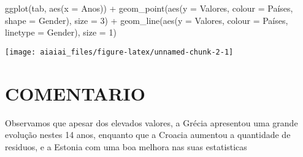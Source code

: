 \documentclass[
]{article}
\newenvironment{Shaded}{\begin{snugshade}}{\end{snugshade}}
\newcommand{\AttributeTok}[1]{\textcolor[rgb]{0.77,0.63,0.00}{#1}}
\newcommand{\DecValTok}[1]{\textcolor[rgb]{0.00,0.00,0.81}{#1}}
\newcommand{\FunctionTok}[1]{\textcolor[rgb]{0.00,0.00,0.00}{#1}}
\newcommand{\NormalTok}[1]{#1}
\newcommand{\SpecialCharTok}[1]{\textcolor[rgb]{0.00,0.00,0.00}{#1}}
\begin{document}
\begin{Shaded}
\begin{Highlighting}[]
\FunctionTok{ggplot}\NormalTok{(tab, }\FunctionTok{aes}\NormalTok{(}\AttributeTok{x =}\NormalTok{ Anos)) }\SpecialCharTok{+}
  \FunctionTok{geom\_point}\NormalTok{(}\FunctionTok{aes}\NormalTok{(}\AttributeTok{y =}\NormalTok{ Valores, }\AttributeTok{colour =}\NormalTok{ Países, }\AttributeTok{shape =}\NormalTok{ Gender), }\AttributeTok{size =} \DecValTok{3}\NormalTok{) }\SpecialCharTok{+}
  \FunctionTok{geom\_line}\NormalTok{(}\FunctionTok{aes}\NormalTok{(}\AttributeTok{y =}\NormalTok{ Valores, }\AttributeTok{colour =}\NormalTok{ Países, }\AttributeTok{linetype =}\NormalTok{ Gender), }\AttributeTok{size =} \DecValTok{1}\NormalTok{)}
\end{Highlighting}
\end{Shaded}

\begin{center}\texttt{[image: aiaiai\_files/figure-latex/unnamed-chunk-2-1]} \end{center}

\hypertarget{comentario}{%
\section{COMENTARIO}\label{comentario}}

Observamos que apesar dos elevados valores, a Grécia apresentou uma
grande evolução nestes 14 anos, enquanto que a Croacia aumentou a
quantidade de residuos, e a Estonia com uma boa melhora nas suas
estatisticas
\end{document}
